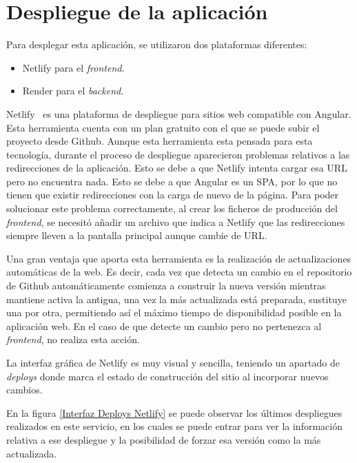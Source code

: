 \section{Despliegue de la aplicación}
Para desplegar esta aplicación, se utilizaron dos plataformas diferentes:
\begin{itemize}
    \item Netlify para el \textit{frontend}.
    \item Render para el \textit{backend}.
\end{itemize}

Netlify~\cite{Netlify} es una plataforma de despliegue para sitios web compatible con Angular. Esta herramienta cuenta con un plan gratuito con el que se puede subir el proyecto desde Github. 
Aunque esta herramienta esta pensada para esta tecnología, durante el proceso de despliegue aparecieron problemas relativos a las redirecciones de la aplicación. Esto se debe a que Netlify intenta cargar esa URL pero no encuentra nada. Esto se debe a que Angular es un SPA, por lo que no tienen que existir redirecciones con la carga de nuevo de la página. Para poder solucionar este problema correctamente, al crear los ficheros de producción del \textit{frontend}, se necesitó añadir un archivo que indica a Netlify que las redirecciones siempre lleven a la pantalla principal aunque cambie de URL.

Una gran ventaja que aporta esta herramienta es la realización de actualizaciones automáticas de la web. Es decir, cada vez que detecta un cambio en el repositorio de Github automáticamente comienza a construir la nueva versión mientras mantiene activa la antigua, una vez la más actualizada está preparada, sustituye una por otra, permitiendo así el máximo tiempo de disponibilidad posible en la aplicación web. En el caso de que detecte un cambio pero no pertenezca al \textit{frontend}, no realiza esta acción. 

La interfaz gráfica de Netlify es muy visual y sencilla, teniendo un apartado de \textit{deploys} donde marca el estado de construcción del sitio al incorporar nuevos cambios.

En la figura \ref{Interfaz Deploys Netlify} se puede observar los últimos despliegues realizados en este servicio, en los cuales se puede entrar para ver la información relativa a ese despliegue y la posibilidad de forzar esa versión como la más actualizada.

